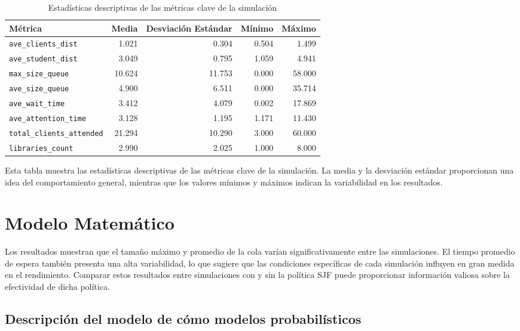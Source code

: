 \documentclass[10pt,twocolumn]{article}
\begin{document}
	\begin{table*}[h!]
		\centering
		\begin{tabular}{lrrrr}
			\hline
			\textbf{Métrica} & \textbf{Media} & \textbf{Desviación Estándar} & \textbf{Mínimo} & \textbf{Máximo} \\
			\hline
			\texttt{ave\_clients\_dist} & 1.021 & 0.304 & 0.504 & 1.499 \\
			\texttt{ave\_student\_dist} & 3.049 & 0.795 & 1.059 & 4.941 \\
			\texttt{max\_size\_queue} & 10.624 & 11.753 & 0.000 & 58.000 \\
			\texttt{ave\_size\_queue} & 4.900 & 6.511 & 0.000 & 35.714 \\
			\texttt{ave\_wait\_time} & 3.412 & 4.079 & 0.002 & 17.869 \\
			\texttt{ave\_attention\_time} & 3.128 & 1.195 & 1.171 & 11.430 \\
			\texttt{total\_clients\_attended} & 21.294 & 10.290 & 3.000 & 60.000 \\
			\texttt{libraries\_count} & 2.990 & 2.025 & 1.000 & 8.000 \\
			\hline
		\end{tabular}
		\caption{Estadísticas descriptivas de las métricas clave de la simulación}
		\label{tab:descriptive_stats}
	\end{table*}
	
	Esta tabla muestra las estadísticas descriptivas de las métricas clave de la simulación. La media y la desviación estándar proporcionan una idea del comportamiento general, mientras que los valores mínimos y máximos indican la variabilidad en los resultados.
	
	\section{Modelo Matemático}
	Los resultados muestran que el tamaño máximo y promedio de la cola varían significativamente entre las simulaciones. El tiempo promedio de espera también presenta una alta variabilidad, lo que sugiere que las condiciones específicas de cada simulación influyen en gran medida en el rendimiento. Comparar estos resultados entre simulaciones con y sin la política SJF puede proporcionar información valiosa sobre la efectividad de dicha política.
	\subsection{Descripción del modelo de cómo modelos probabilísticos}
\end{document}
